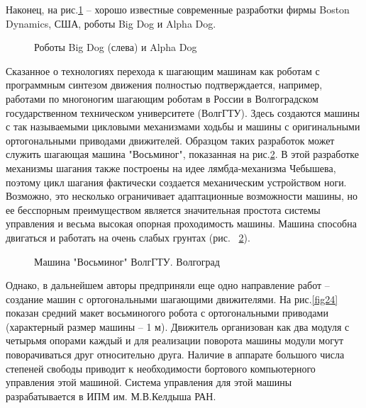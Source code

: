 Наконец, на рис.\ref{fig22} – хорошо известные современные разработки фирмы Boston Dynamics, США, роботы Big Dog и Alpha Dog.

\begin{figure}[here]
\begin{minipage}{0.49\linewidth}
\end{minipage}
\hfill
\begin{minipage}{0.49\linewidth}
\end{minipage}
\caption{Роботы Big Dog (слева) и Alpha Dog}
\label{fig22}
\end{figure} 


Сказанное о технологиях перехода к шагающим машинам как роботам с программным синтезом движения полностью подтверждается, например, работами по многоногим шагающим роботам в России в Волгоградском государственном техническом университете (ВолгГТУ). Здесь создаются машины с так называемыми цикловыми механизмами ходьбы и машины с оригинальными ортогональными приводами движителей. Образцом таких разработок может служить шагающая машина "Восьминог", показанная на рис.\ref{fig23}. В этой разработке механизмы шагания также построены на идее лямбда-механизма Чебышева, поэтому цикл шагания фактически создается механическим устройством ноги. Возможно, это несколько ограничивает адаптационные возможности машины, но ее бесспорным преимуществом является значительная простота системы управления и весьма высокая опорная проходимость машины. Машина способна двигаться и работать на очень слабых грунтах (рис. ~\ref{fig23}).

\begin{figure}[h]
\begin{minipage}{0.49\linewidth}
\end{minipage}
\hfill
\begin{minipage}{0.49\linewidth}
\end{minipage}
\caption{Машина "Восьминог" ВолгГТУ. Волгоград}
\label{fig23}
\end{figure} 

Однако, в дальнейшем авторы предприняли еще одно направление работ – создание машин с ортогональными шагающими движителями. На рис.\ref{fig24} показан средний макет восьминогого робота с ортогональными приводами (характерный размер машины – 1 м). Движитель организован как два модуля с четырьмя опорами каждый и для реализации поворота машины модули могут поворачиваться друг относительно друга. Наличие в аппарате большого числа степеней свободы приводит к необходимости бортового компьютерного управления этой машиной. Система управления для этой машины разрабатывается в ИПМ им. М.В.Келдыша РАН.

